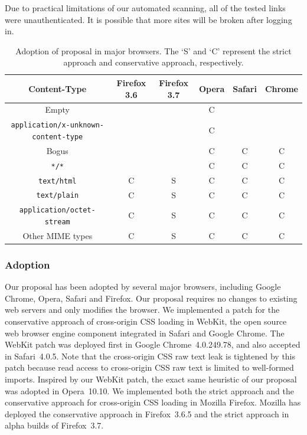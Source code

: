 \documentclass{acm_proc_article-sp}
\begin{document}
Due to practical limitations of our automated scanning, all of the tested links were unauthenticated. It is possible that more sites will be broken after logging in.

\begin{table}
\centering
\begin{tabular}{|c|c|c|c|c|c|} \hline
Content-Type&Firefox 3.6&Firefox 3.7&Opera&Safari&Chrome\\ \hline
Empty&&&C&&\\ \hline
\texttt{application/x-unknown-content-type}&&&C&&\\ \hline
Bogus&&&C&C&C \\ \hline
\texttt{*/*}&&&C&C&C \\ \hline
\texttt{text/html}&C&S&C&C&C\\ \hline
\texttt{text/plain}&C&S&C&C&C\\ \hline
\texttt{application/octet-stream}&C&S&C&C&C\\ \hline
Other MIME types&C&S&C&C&C\\
\hline\end{tabular}
\caption{Adoption of proposal in major browsers. The `S' and `C' represent the strict approach and conservative approach, respectively.}
\label{table:adoption}
\end{table}

\subsubsection{Adoption}
Our proposal has been adopted by several major browsers, including Google Chrome, Opera, Safari and Firefox. Our proposal requires no changes to existing web servers and only modifies the browser. We implemented a patch for the conservative approach of cross-origin CSS loading in WebKit, the open source web browser engine component integrated in Safari and Google Chrome. The WebKit patch was deployed first in Google Chrome~4.0.249.78, and also accepted in Safari~4.0.5. Note that the cross-origin CSS raw text leak is tightened by this patch because read access to cross-origin CSS raw text is limited to well-formed imports. Inspired by our WebKit patch, the exact same heuristic of our proposal was adopted in Opera~10.10. We implemented both the strict approach and the conservative approach for cross-origin CSS loading in Mozilla Firefox. Mozilla has deployed the conservative approach in Firefox~3.6.5 and the strict approach in alpha builds of Firefox~3.7.
\end{document}
